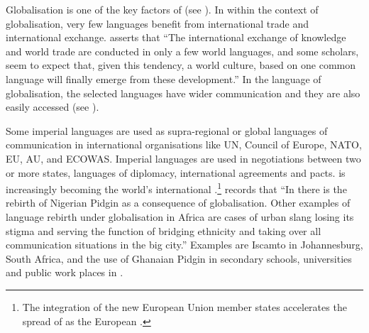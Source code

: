 \documentclass[output=paper,
modfonts
]{langscibook}
\begin{document}
Globalisation is one of the key factors of  (see \citealt[21]{Austin2011}). In  within the context of globalisation, very few languages benefit from international trade and international exchange. \citet[446]{Brenzinger2009} asserts that “The international exchange of knowledge and world trade are conducted in only a few world languages, and some scholars, seem to expect that, given this tendency, a world culture, based on one common language will finally emerge from these development.” In the language of globalisation, the selected languages have wider communication and they are also easily accessed (see \citealt[5]{Bamgbose2011}).

Some imperial languages are used as supra-regional or global languages of communication in international organisations like UN, Council of Europe, NATO, EU, AU, and ECOWAS. Imperial languages are used in negotiations between two or more states, languages of diplomacy, international agreements and pacts.  is increasingly becoming the world’s international .\footnote{The integration of the new European Union member states accelerates the spread of  as the European . }{ }\citet[160]{Mous2003} records that “In  there is the rebirth of Nigerian Pidgin  as a consequence of globalisation. Other examples of language rebirth under globalisation in Africa are cases of urban slang losing its stigma and serving the function of bridging ethnicity and taking over all communication situations in the big city.” Examples are Iscamto in Johannesburg, South Africa, and the use of Ghanaian Pidgin  in secondary schools, universities and public work places in . 
\end{document}

